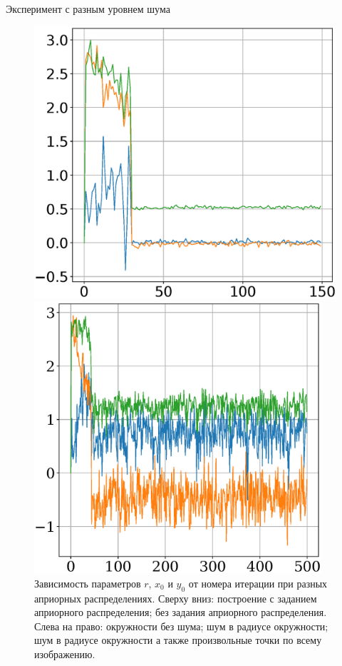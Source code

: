 \documentclass[10pt,pdf,hyperref={unicode}]{beamer}
\begin{document}
\begin{frame}{Эксперимент с разным уровнем шума}
\begin{figure}[h]
\begin{minipage}{.32\textwidth}
\end{minipage}
\begin{minipage}{.32\textwidth}
\hspace{-2.1mm}
      \includegraphics[width = \textwidth]{figures/901noise.eps}
\end{minipage}
\begin{minipage}{.32\textwidth}
\hspace{-2mm}
      \includegraphics[width = 0.95\textwidth]{figures/902noise.eps}
\end{minipage}
\caption{Зависимость параметров $r$, $x_0$ и $y_0$ от номера итерации при разных априорных распределениях. Сверху вниз: построение с заданием априорного распределения; без задания априорного распределения. Слева на право: окружности без шума; шум в радиусе окружности; шум в радиусе окружности а также произвольные точки по всему изображению.}
\label{ce:fig4}
\end{figure}

\end{frame}
\end{document}
